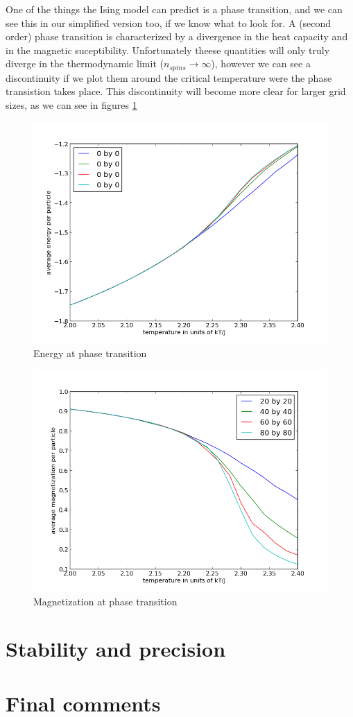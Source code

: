 \documentclass[a4paper,english, 10pt, twoside]{article}
\begin{document}
One of the things the Ising model can predict is a phase transition, and we can see this in our simplified version too, if we 
know what to look for. A (second order) phase transition is characterized by a divergence in the heat capacity and in the 
magnetic suceptibility. Unfortunately theese quantities will only truly diverge in the thermodynamic limit ($n_{spins}
\to \infty$), however we can see a discontinuity if we plot them around the critical temperature were the phase transistion 
takes place. This discontinuity will become more clear for larger grid sizes, as we can see in figures \ref{E_transition}
\begin{figure}[H]
 \includegraphics[scale=0.5]{energy.png}
 \caption{Energy at phase transition}
\label{E_transition}
 \end{figure} 
 
 \begin{figure}[H]
 \includegraphics[scale=0.5]{magnetization.png}
 \caption{Magnetization at phase transition}
\label{M_transition}
 \end{figure} 
\section*{Stability and precision}

\section*{Final comments}
\end{document}
